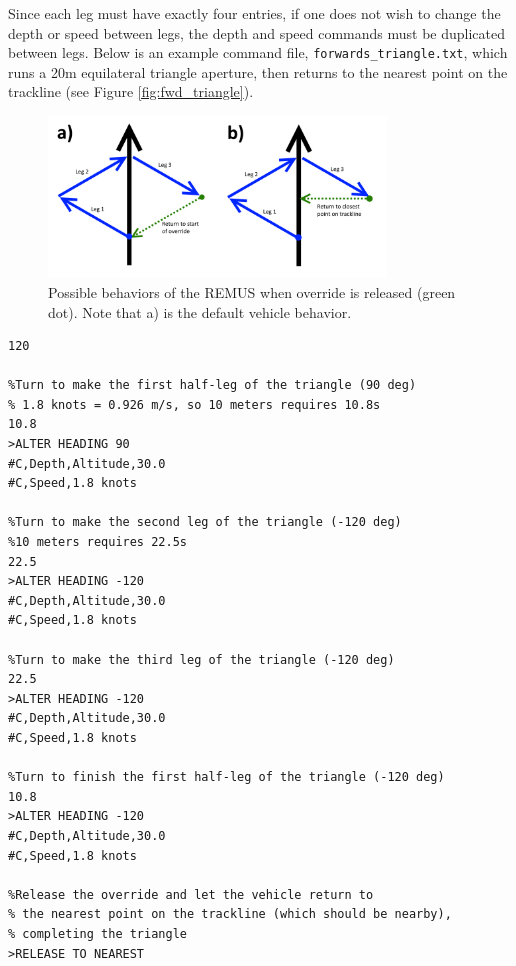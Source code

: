 \documentclass[11pt]{article} %
\begin{document}
Since each leg must have exactly four entries, if one does not wish to change the depth or speed between legs, the depth and 
speed commands must be
duplicated between legs. Below is an example command file, \mbox{\texttt{forwards\_triangle.txt}}, which runs a 20m 
equilateral triangle aperture, then
returns to the nearest point on the trackline (see Figure \ref{fig:fwd_triangle}).


\begin{figure}[hb]
\vspace{22pt}
\centering
\captionsetup{width=.6\linewidth}
\includegraphics[width=0.8\textwidth]{img/return_behavior.png}
\caption{Possible behaviors of the REMUS when override is released (green dot). Note that a) is the default vehicle behavior.}
\label{fig:return}
\vspace{22pt}
\end{figure}


\begin{Verbatim}[xleftmargin=.5in,fontsize=\small,frame=single]
%Cooldown period for this particular aperture, in seconds
120

%Turn to make the first half-leg of the triangle (90 deg)
% 1.8 knots = 0.926 m/s, so 10 meters requires 10.8s
10.8
>ALTER HEADING 90
#C,Depth,Altitude,30.0
#C,Speed,1.8 knots

%Turn to make the second leg of the triangle (-120 deg)
%10 meters requires 22.5s
22.5
>ALTER HEADING -120
#C,Depth,Altitude,30.0
#C,Speed,1.8 knots

%Turn to make the third leg of the triangle (-120 deg)
22.5
>ALTER HEADING -120
#C,Depth,Altitude,30.0
#C,Speed,1.8 knots

%Turn to finish the first half-leg of the triangle (-120 deg)
10.8
>ALTER HEADING -120
#C,Depth,Altitude,30.0
#C,Speed,1.8 knots

%Release the override and let the vehicle return to
% the nearest point on the trackline (which should be nearby), 
% completing the triangle
>RELEASE TO NEAREST
\end{Verbatim}
\end{document}
